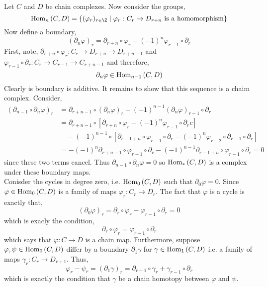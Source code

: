 \documentclass[12pt]{extarticle}
\begin{document}
\begin{exercise}
Let $C$ and $D$ be chain complexes. Now consider the groups,
\[ \Hom{n}{C}{D} = \{ (\varphi_r)_{r \in \Z} \mid \varphi_r : C_r \to D_{r + n} \text{ is a homomorphism} \}  \] 
Now define a boundary,
\[ (\partial_n \varphi)_r = \partial_{r + n} \circ \varphi_r - (-1)^n \varphi_{r-1}\circ \partial_r  \]
First, note, $\partial_{r + n} \circ \varphi_r : C_r \to D_{r + n} \to D_{r + n - 1}$ and $\varphi_{r-1}\circ \partial_r  : C_r \to C_{r-1} \to C_{r + n - 1}$
and therefore,
\[ \partial_n \varphi \in \mathrm{Hom}_{n-1}\left( C, D \right) \]
Clearly is boundary is additive. It remains to show that this sequence is a chaim complex. Consider,
\begin{align*}
(\partial_{n-1} \circ \partial_{n} \varphi)_r & = \partial_{r + n - 1} \circ (\partial_n \varphi)_r - (-1)^{n-1} (\partial_n \varphi)_{r-1} \circ \partial_r
\\
& = \partial_{r + n - 1} \circ [ \partial_{r + n} \circ \varphi_r - (-1)^{n} \varphi_{r-1} \circ \partial_r c ] 
\\
& \quad - (-1)^{n-1} \circ [ \partial_{r - 1 + n} \circ \varphi_{r-1} \circ \partial_r  - (-1)^{n} \varphi_{r-2} \circ \partial_{r-1} \circ \partial_r ] 
\\
& = - (-1)^n \partial_{r + n - 1} \circ  \varphi_{r-1} \circ \partial_r  - (-1)^{n - 1} \partial_{r-1 + n} \circ \varphi_{r-1} \circ \partial_r = 0
\end{align*}
since these two terms cancel. Thus $\partial_{n-1} \circ \partial_n \varphi = 0$ so $\mathrm{Hom}_{*}\left( C, D \right)$ is a complex under these boundary maps.
\bigskip\\
Conisder the cycles in degree zero, i.e. $\mathrm{Hom}_{0}\left( C, D \right)$ such that $\partial_0 \varphi = 0$. Since $\varphi \in \mathrm{Hom}_{0}\left( C, D \right)$ is a family of maps $\varphi_r : C_r \to D_r$.  The fact that $\varphi$ is a cycle is exactly that,
\[ (\partial_0 \varphi)_r = \partial_r \circ \varphi_r - \varphi_{r-1} \circ \partial_r = 0 \]
which is exacly the condition,
\[ \partial_r \circ \varphi_r = \varphi_{r-1} \circ \partial_r \] 
which says that $\varphi : C \to D$ is a chain map. Furthermore, suppose $\varphi, \psi \in \mathrm{Hom}_{0}\left( C, D \right)$ differ by a boundary $\partial_1 \gamma$ for $\gamma \in \mathrm{Hom}_{1}\left( C, D \right)$ i.e. a family of maps $\gamma_r : C_r \to D_{r + 1}$. Thus,
\[ \varphi_r - \psi_r = (\partial_1 \gamma)_r = \partial_{r+1} \circ \gamma_r + \gamma_{r - 1} \circ \partial_r \]
which is exactly the condition that $\gamma$ be a chain homotopy between $\varphi$ and $\psi$.
\end{exercise}
\end{document}
